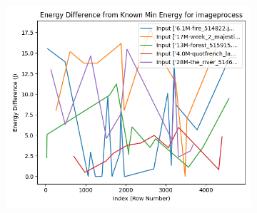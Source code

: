 \documentclass[times, 10pt,twocolumn]{article}
\begin{document}
\begin{figure}[ht]
\begin{subfigure}[b]{0.22\textwidth}
     \caption{}
     \label{fig:image_energy_diff}
   \end{subfigure}
   \hfill
   \begin{subfigure}[b]{0.22\textwidth}
      \includegraphics[width=\textwidth]{imgs/final_experiment_plots/model_analysis/measurement_data_analysis/image_compare_min.png}
     \caption{}
     \label{fig:image_compare_min}
   \end{subfigure}


\end{figure}
\end{document}
